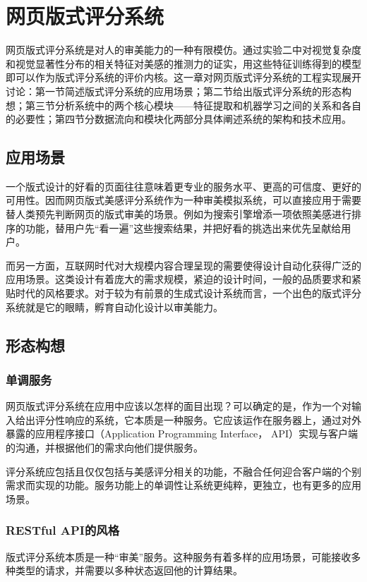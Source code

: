\chapter{网页版式评分系统}
\label{chap:application}

网页版式评分系统是对人的审美能力的一种有限模仿。通过实验二中对视觉复杂度和视觉显著性分布的相关特征对美感的推测力的证实，用这些特征训练得到的模型即可以作为版式评分系统的评价内核。这一章对网页版式评分系统的工程实现展开讨论：第一节简述版式评分系统的应用场景；第二节给出版式评分系统的形态构想；第三节分析系统中的两个核心模块——特征提取和机器学习之间的关系和各自的必要性；第四节分数据流向和模块化两部分具体阐述系统的架构和技术应用。

\section{应用场景}
一个版式设计的好看的页面往往意味着更专业的服务水平、更高的可信度、更好的可用性。因而网页版式美感评分系统作为一种审美模拟系统，可以直接应用于需要替人类预先判断网页的版式审美的场景。例如为搜索引擎增添一项依照美感进行排序的功能，替用户先“看一遍”这些搜索结果，并把好看的挑选出来优先呈献给用户。

而另一方面，互联网时代对大规模内容合理呈现的需要使得设计自动化获得广泛的应用场景。这类设计有着庞大的需求规模，紧迫的设计时间，一般的品质要求和紧贴时代的风格要求。对于较为有前景的生成式设计系统而言，一个出色的版式评分系统就是它的眼睛，孵育自动化设计以审美能力。

\section{形态构想}
\subsection{单调服务}
网页版式评分系统在应用中应该以怎样的面目出现？可以确定的是，作为一个对输入给出评分性响应的系统，它本质是一种服务。它应该运作在服务器上，通过对外暴露的应用程序接口（Application Programming Interface， API）实现与客户端的沟通，并根据他们的需求向他们提供服务。

评分系统应包括且仅仅包括与美感评分相关的功能，不融合任何迎合客户端的个别需求而实现的功能。服务功能上的单调性让系统更纯粹，更独立，也有更多的应用场景。

\subsection{RESTful API的风格}
版式评分系统本质是一种“审美”服务。这种服务有着多样的应用场景，可能接收多种类型的请求，并需要以多种状态返回他的计算结果。

